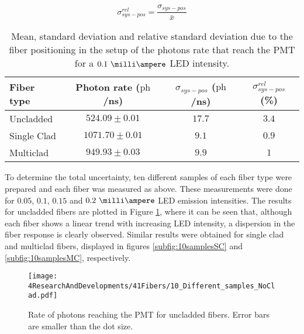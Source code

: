 \begin{equation}
\sigma^{rel}_{sys-pos} = \frac{\sigma_{sys-pos}}{\bar{x}}
\label{eq:RelativeStandardDesviation}
\end{equation}

\begin{table}[htbp]
\centering{}%
\begin{tabular}{lccc}
\toprule 
Fiber type & Photon rate ($\text{ph}$/ns) & $\sigma_{sys-pos}$ ($\text{ph}$/ns) & $\sigma^{rel}_{sys-pos}$ (\%) \tabularnewline
\midrule
\midrule 
Uncladded & $524.09 \pm 0.01$ & $17.7$ & $3.4$ \tabularnewline
Single Clad & $1071.70 \pm 0.01$ & $9.1$ & $0.9$ \tabularnewline
Multiclad & $949.93 \pm 0.03$ & $9.9$ & $1$ \tabularnewline
\bottomrule
\end{tabular}
\caption{Mean, standard deviation and relative standard deviation due to the fiber positioning in the setup of the photons rate that reach the PMT for a $0.1~\milli\ampere$ LED intensity.}
\label{tab:PositionStandardDeviation}
\end{table}



To determine the total uncertainty, ten different samples of each fiber type were prepared and each fiber was measured as above. These measurements were done for $0.05$, $0.1$, $0.15$ and $0.2~\milli\ampere$ LED emission intensities. The results for uncladded fibers are plotted in Figure \ref{fig:10samplesNC}, where it can be seen that, although each fiber shows a linear trend with increasing LED intensity, a dispersion in the fiber response is clearly observed. Similar results were obtained for single clad and multiclad fibers, displayed in figures \ref{subfig:10samplesSC} and \ref{subfig:10samplesMC}, respectively.

\begin{figure}[h]
\centering
\texttt{[image: 4ResearchAndDevelopments/41Fibers/10\_Different\_samples\_NoClad.pdf]}
\caption{Rate of photons reaching the PMT for uncladded fibers. Error bars are smaller than the dot size.\label{fig:10samplesNC}}
\end{figure}

